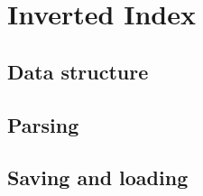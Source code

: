 \section{Inverted Index}
\label{sec:index}

\subsection{Data structure}

\subsection{Parsing}

\subsection{Saving and loading}
